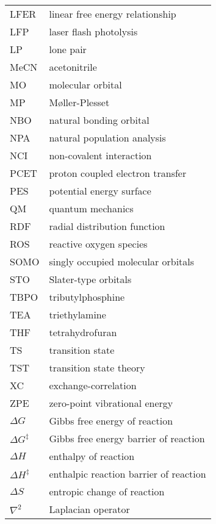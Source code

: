 \begin{longtable}{m{3cm} l}
  LFER & linear free energy relationship \\
  LFP & laser flash photolysis \\
  LP & lone pair \\
  MeCN & acetonitrile \\
  MO & molecular orbital \\
  MP & M{\o}ller-Plesset \\
  NBO & natural bonding orbital \\
  NPA & natural population analysis \\
  NCI & non-covalent interaction \\
  PCET & proton coupled electron transfer \\
  PES & potential energy surface \\
  QM & quantum mechanics \\
  RDF & radial distribution function \\
  ROS & reactive oxygen species \\
  SOMO & singly occupied molecular orbitals \\
  STO & Slater-type orbitals \\
  TBPO & tributylphosphine \\
  TEA & triethylamine \\
  THF & tetrahydrofuran \\
  TS & transition state \\
  TST & transition state theory \\
  XC & exchange-correlation \\
  ZPE & zero-point vibrational energy \\
  $\Delta G$ & Gibbs free energy of reaction  \\
  $\Delta G^{\ddagger}$ & Gibbs free energy barrier of reaction  \\
  $\Delta H$ & enthalpy of reaction  \\
  $\Delta H^{\ddagger}$ & enthalpic reaction barrier of reaction  \\
  $\Delta S$ & entropic change of reaction  \\
  $\nabla^2$ & Laplacian operator  \\
\end{longtable}
\ResumeSuspendedCounters

